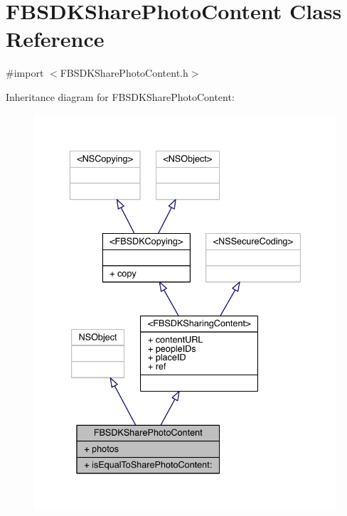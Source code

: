 \hypertarget{interface_f_b_s_d_k_share_photo_content}{\section{F\-B\-S\-D\-K\-Share\-Photo\-Content Class Reference}
\label{interface_f_b_s_d_k_share_photo_content}
}


{\ttfamily \#import $<$F\-B\-S\-D\-K\-Share\-Photo\-Content.\-h$>$}



Inheritance diagram for F\-B\-S\-D\-K\-Share\-Photo\-Content\-:
\nopagebreak
\begin{figure}[H]
\begin{center}
\leavevmode
\includegraphics[width=336pt]{interface_f_b_s_d_k_share_photo_content__inherit__graph}
\end{center}
\end{figure}


